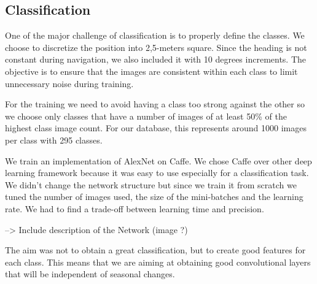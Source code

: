 \subsection{Classification}

One of the major challenge of classification is to properly define the classes. We choose to discretize the position into 2,5-meters square. Since the heading is not constant during navigation, we also included it with 10 degrees increments. The objective is to ensure that the images are consistent within each class to limit unnecessary noise during training. 



For the training we need to avoid having a class too strong against the other so we choose only classes that have a number of images of at least 50\% of the highest class image count. For our database, this represents around 1000 images per class with 295 classes.

We train an implementation of AlexNet on Caffe. We chose Caffe over other deep learning framework because it was easy to use especially for a classification task. We didn't change the network structure but since we train it from scratch we tuned the number of images used, the size of the mini-batches and the learning rate. We had to find a trade-off between learning time and precision.

--> Include description of the Network (image ?)

The aim was not to obtain a great classification, but to create good features for each class. This means that we are aiming at obtaining good convolutional layers that will be independent of seasonal changes.





